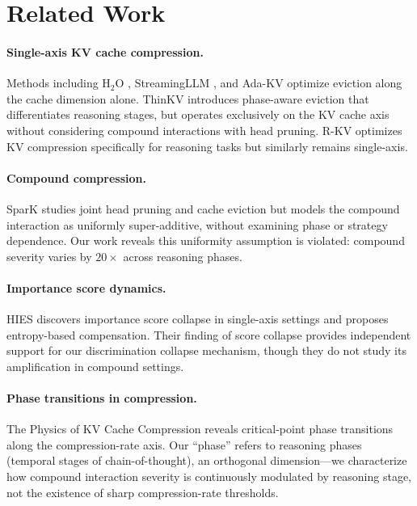 \documentclass[11pt,a4paper]{article}
\begin{document}
\section{Related Work}

\paragraph{Single-axis KV cache compression.} Methods including H$_2$O \cite{h2o2023}, StreamingLLM \cite{streamingllm2024}, and Ada-KV \cite{adakv2024} optimize eviction along the cache dimension alone. ThinKV \cite{thinkv2025} introduces phase-aware eviction that differentiates reasoning stages, but operates exclusively on the KV cache axis without considering compound interactions with head pruning. R-KV \cite{rkv2025} optimizes KV compression specifically for reasoning tasks but similarly remains single-axis.

\paragraph{Compound compression.} SparK \cite{spark2024} studies joint head pruning and cache eviction but models the compound interaction as uniformly super-additive, without examining phase or strategy dependence. Our work reveals this uniformity assumption is violated: compound severity varies by $20\times$ across reasoning phases.

\paragraph{Importance score dynamics.} HIES \cite{hies2025} discovers importance score collapse in single-axis settings and proposes entropy-based compensation. Their finding of score collapse provides independent support for our discrimination collapse mechanism, though they do not study its amplification in compound settings.

\paragraph{Phase transitions in compression.} The Physics of KV Cache Compression \cite{physicskv2026} reveals critical-point phase transitions along the compression-rate axis. Our ``phase'' refers to reasoning phases (temporal stages of chain-of-thought), an orthogonal dimension---we characterize how compound interaction severity is continuously modulated by reasoning stage, not the existence of sharp compression-rate thresholds.
\end{document}
